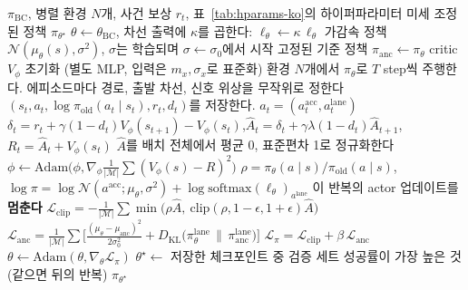 \documentclass[10pt,a4paper]{article}
\newcommand{\KL}{D_{\mathrm{KL}}}
\begin{document}
\begin{algorithm}[t]
\caption{BC 정책에서 시작하는 Anchored PPO 미세 조정}
\label{alg:ppo-ko}
\begin{algorithmic}[1]
\Require $\pi_{\mathrm{BC}}$, 병렬 환경 $N$개, 사건 보상 $r_t$, 표~\ref{tab:hparams-ko}의 하이퍼파라미터
\Ensure 미세 조정된 정책 $\pi_{\theta^\star}$
\State $\theta \gets \theta_{\mathrm{BC}}$, 차선 출력에 $\kappa$를 곱한다: $\ell_\theta \gets \kappa\,\ell_\theta$ 
\State 가감속 정책 $\mathcal{N}(\mu_\theta(s), \sigma^2)$, $\sigma$는 학습되며 $\sigma \gets \sigma_0$에서 시작
\State 고정된 기준 정책 $\pi_{\mathrm{anc}} \gets \pi_\theta$ 
\State critic $V_\phi$ 초기화 (별도 MLP, 입력은 $m_x,\sigma_x$로 표준화)
  \State 환경 $N$개에서 $\pi_\theta$로 $T$ step씩 주행한다. 에피소드마다 경로, 출발 차선, 신호 위상을 무작위로 정한다
  \State $(s_t, a_t, \log\pi_{\mathrm{old}}(a_t\mid s_t), r_t, d_t)$를 저장한다. $a_t = (a^{\mathrm{acc}}_t, a^{\mathrm{lane}}_t)$
  \State $\delta_t = r_t + \gamma(1-d_t)V_\phi(s_{t+1}) - V_\phi(s_t)$,\quad $\hat A_t = \delta_t + \gamma\lambda(1-d_t)\hat A_{t+1}$,\quad $R_t = \hat A_t + V_\phi(s_t)$
  \State $\hat A$를 배치 전체에서 평균 0, 표준편차 1로 정규화한다
   
     \State $\phi \gets \mathrm{Adam}\big(\phi, \nabla_\phi \tfrac{1}{|\mathcal{M}|}\sum (V_\phi(s)-R)^2\big)$ \EndFor
  \EndFor
   
        \State $\rho = \pi_\theta(a\mid s)/\pi_{\mathrm{old}}(a\mid s)$, $\log\pi = \log\mathcal{N}(a^{\mathrm{acc}};\mu_\theta,\sigma^2) + \log\mathrm{softmax}(\ell_\theta)_{a^{\mathrm{lane}}}$
         이 반복의 actor 업데이트를 \textbf{멈춘다} \EndIf
        \State $\displaystyle \mathcal{L}_{\mathrm{clip}} = -\frac{1}{|\mathcal{M}|}\sum \min\!\big(\rho\hat A,\ \mathrm{clip}(\rho,1-\epsilon,1+\epsilon)\hat A\big)$
        \State $\displaystyle \mathcal{L}_{\mathrm{anc}} = \frac{1}{|\mathcal{M}|}\sum\Big[\frac{(\mu_\theta-\mu_{\mathrm{anc}})^2}{2\sigma_0^2} + \KL\big(\pi^{\mathrm{lane}}_\theta\,\|\,\pi^{\mathrm{lane}}_{\mathrm{anc}}\big)\Big]$
        \State $\mathcal{L}_\pi = \mathcal{L}_{\mathrm{clip}} + \beta\,\mathcal{L}_{\mathrm{anc}}$ 
        \State $\theta \gets \mathrm{Adam}(\theta, \nabla_\theta \mathcal{L}_\pi)$ 
      \EndFor
    \EndFor
  \EndIf
\EndFor
\State $\theta^\star \gets$ 저장한 체크포인트 중 검증 세트 성공률이 가장 높은 것 (같으면 뒤의 반복)
\State \Return $\pi_{\theta^\star}$ 
\end{algorithmic}
\end{algorithm}
\end{document}
